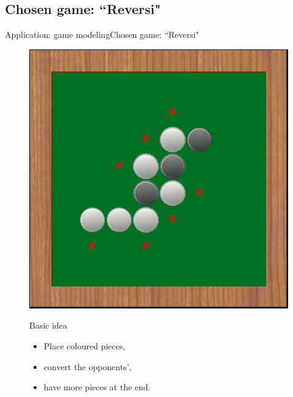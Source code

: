 \subsection{Chosen game: ``Reversi"}
\begin{frame}{Application: game modeling}{Chosen game: ``Reversi"}

\begin{figure}[ht]
\begin{minipage}[t]{0.4\linewidth}
\vspace{0pt}
\centering
\includegraphics[width=\textwidth]{img/application/reversi.png}
\end{minipage}
\hfill
\begin{minipage}[t]{0.5\linewidth}
\vspace{0pt}
\begin{block}{Basic idea}
\begin{itemize} 
\item Place coloured pieces,
\item convert the opponents',
\item have more pieces at the end.
\end{itemize}
\end{block}
\end{minipage}
\end{figure}

\end{frame}

